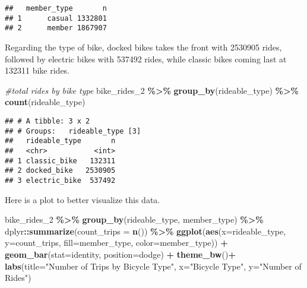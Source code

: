 \documentclass[
]{article}
\newenvironment{Shaded}{\begin{snugshade}}{\end{snugshade}}
\newcommand{\AttributeTok}[1]{\textcolor[rgb]{0.13,0.29,0.53}{#1}}
\newcommand{\CommentTok}[1]{\textcolor[rgb]{0.56,0.35,0.01}{\textit{#1}}}
\newcommand{\FunctionTok}[1]{\textcolor[rgb]{0.13,0.29,0.53}{\textbf{#1}}}
\newcommand{\NormalTok}[1]{#1}
\newcommand{\SpecialCharTok}[1]{\textcolor[rgb]{0.81,0.36,0.00}{\textbf{#1}}}
\newcommand{\StringTok}[1]{\textcolor[rgb]{0.31,0.60,0.02}{#1}}
\begin{document}
\begin{verbatim}
##   member_type       n
## 1      casual 1332801
## 2      member 1867907
\end{verbatim}

Regarding the type of bike, docked bikes takes the front with 2530905
rides, followed by electric bikes with 537492 rides, while classic bikes
coming last at 132311 bike rides.

\begin{Shaded}
\begin{Highlighting}[]
\CommentTok{\#total rides by bike type}
\NormalTok{bike\_rides\_2 }\SpecialCharTok{\%\textgreater{}\%}
  \FunctionTok{group\_by}\NormalTok{(rideable\_type) }\SpecialCharTok{\%\textgreater{}\%} 
  \FunctionTok{count}\NormalTok{(rideable\_type)}
\end{Highlighting}
\end{Shaded}

\begin{verbatim}
## # A tibble: 3 x 2
## # Groups:   rideable_type [3]
##   rideable_type       n
##   <chr>           <int>
## 1 classic_bike   132311
## 2 docked_bike   2530905
## 3 electric_bike  537492
\end{verbatim}

Here is a plot to better visualize this data.

\begin{Shaded}
\begin{Highlighting}[]
\NormalTok{bike\_rides\_2 }\SpecialCharTok{\%\textgreater{}\%}
  \FunctionTok{group\_by}\NormalTok{(rideable\_type, member\_type) }\SpecialCharTok{\%\textgreater{}\%}
\NormalTok{  dplyr}\SpecialCharTok{::}\FunctionTok{summarize}\NormalTok{(}\AttributeTok{count\_trips =} \FunctionTok{n}\NormalTok{()) }\SpecialCharTok{\%\textgreater{}\%}  
  \FunctionTok{ggplot}\NormalTok{(}\FunctionTok{aes}\NormalTok{(}\AttributeTok{x=}\NormalTok{rideable\_type, }\AttributeTok{y=}\NormalTok{count\_trips, }\AttributeTok{fill=}\NormalTok{member\_type, }\AttributeTok{color=}\NormalTok{member\_type)) }\SpecialCharTok{+}
  \FunctionTok{geom\_bar}\NormalTok{(}\AttributeTok{stat=}\StringTok{\textquotesingle{}identity\textquotesingle{}}\NormalTok{, }\AttributeTok{position=}\StringTok{\textquotesingle{}dodge\textquotesingle{}}\NormalTok{) }\SpecialCharTok{+}
  \FunctionTok{theme\_bw}\NormalTok{()}\SpecialCharTok{+}
  \FunctionTok{labs}\NormalTok{(}\AttributeTok{title=}\StringTok{"Number of Trips by Bicycle Type"}\NormalTok{, }\AttributeTok{x=}\StringTok{"Bicycle Type"}\NormalTok{, }\AttributeTok{y=}\StringTok{"Number of Rides"}\NormalTok{)}
\end{Highlighting}
\end{Shaded}
\end{document}
